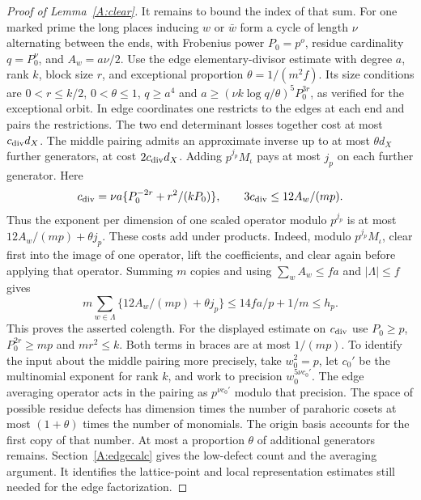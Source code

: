 \begin{proof}[Proof of Lemma~\ref{A:clear}]
It remains to bound the index of that sum. For one marked prime the long places inducing $w$ or $\bar w$ form a cycle of length $\nu$ alternating between the ends, with Frobenius power $P_0=p^o$, residue cardinality $q=P_0^\nu$, and $A_w=a\nu/2$. Use the edge elementary-divisor estimate with degree $a$, rank $k$, block size $r$, and exceptional proportion $\theta=1/(m^2f)$. Its size conditions are $0<r\le k/2$, $0<\theta\le1$, $q\ge a^4$ and $a\ge(\nu k\log q/\theta)^5P_0^{3r}$, as verified for the exceptional orbit. In edge coordinates one restricts to the edges at each end and pairs the restrictions. The two end determinant losses together cost at most $c_{\rm div}d_X$. The middle pairing admits an approximate inverse up to at most $\theta d_X$ further generators, at cost $2c_{\rm div}d_X$. Adding $p^{j_p}M_\iota$ pays at most $j_p$ on each further generator. Here
\[
 c_{\rm div}=\nu a\{P_0^{-2r}+r^2/(kP_0)\},\qquad
 3c_{\rm div}\le 12 A_w/(mp).
\]
Thus the exponent per dimension of one scaled operator modulo $p^{j_p}$ is at most $12A_w/(mp)+\theta j_p$. These costs add under products. Indeed, modulo $p^{j_p}M_\iota$, clear first into the image of one operator, lift the coefficients, and clear again before applying that operator. Summing $m$ copies and using $\sum_w A_w\le fa$ and $|\Lambda|\le f$ gives
\[
 m\sum_{w\in\Lambda}\{12A_w/(mp)+\theta j_p\}
 \le 14fa/p+1/m\le h_p.
\]
This proves the asserted colength. For the displayed estimate on $c_{\rm div}$ use $P_0\ge p$, $P_0^{2r}\ge mp$ and $mr^2\le k$. Both terms in braces are at most $1/(mp)$. To identify the input about the middle pairing more precisely, take $w_0^2=p$, let $c_0'$ be the multinomial exponent for rank $k$, and work to precision $w_0^{5\nu c_0'}$. The edge averaging operator acts in the pairing as $p^{\nu c_0'}$ modulo that precision. The space of possible residue defects has dimension times the number of parahoric cosets at most $(1+\theta)$ times the number of monomials. The origin basis accounts for the first copy of that number. At most a proportion $\theta$ of additional generators remains. Section~\ref{A:edgecalc} gives the low-defect count and the averaging argument. It identifies the lattice-point and local representation estimates still needed for the edge factorization.


\end{proof}
